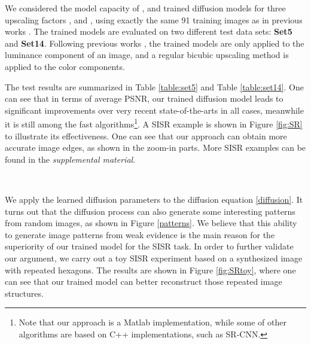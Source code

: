 \documentclass[10pt,journal,compsoc]{IEEEtran}
\begin{document}
We considered the model capacity of , and trained diffusion models for three upscaling 
factors ,  and , using exactly 
the same 91 training images as in previous works \cite{ANR, schulter15}. The trained models are evaluated on two 
different test data sets: \textbf{Set5} and \textbf{Set14}. Following previous works \cite{ANR, SRCNN, schulter15}, the trained 
models are only applied to the luminance component of an image, and a regular bicubic upscaling method is applied to 
the color components. 

The test results are summarized in Table \ref{table:set5} and 
Table \ref{table:set14}. One can see that in terms of average PSNR, 
our trained diffusion model  leads to significant 
improvements over very recent state-of-the-arts in all cases, meanwhile it is still among the fast algorithms\footnote{Note that our approach is a Matlab implementation, while some of other algorithms are 
based on C++ implementations, such as SR-CNN.}. A SISR example is shown in Figure \ref{fig:SR} 
to illustrate its effectiveness. One can see that our approach can obtain more 
accurate image edges, 
as shown in the zoom-in parts. More SISR examples can be found in the \textit{supplemental material}. 

\begin{figure*}[t!]
\centering
    \hfill
    \hfill
    \hfill
    \hfill
    \hfill
    \\
\vspace*{-0.25cm}
    \caption{A toy experiment on a synthesized image with repeated hexagons for the upscaling factor .}\label{fig:SRtoy}
\end{figure*}

We apply the learned diffusion parameters to the diffusion equation \eqref{diffusion}. It turns out that 
the diffusion process can also generate some interesting patterns from random images, as shown in Figure \ref{patterns}. 
We believe that this 
ability to generate image patterns from weak evidence is the main reason for the superiority of our trained model for the 
SISR task. In order to further validate our argument, we carry out a toy SISR experiment based on a synthesized image 
with repeated hexagons. The results are shown in Figure \ref{fig:SRtoy}, where one can see that our trained model can better 
reconstruct those repeated image structures. 
\vspace*{-0.3cm}
\end{document}

